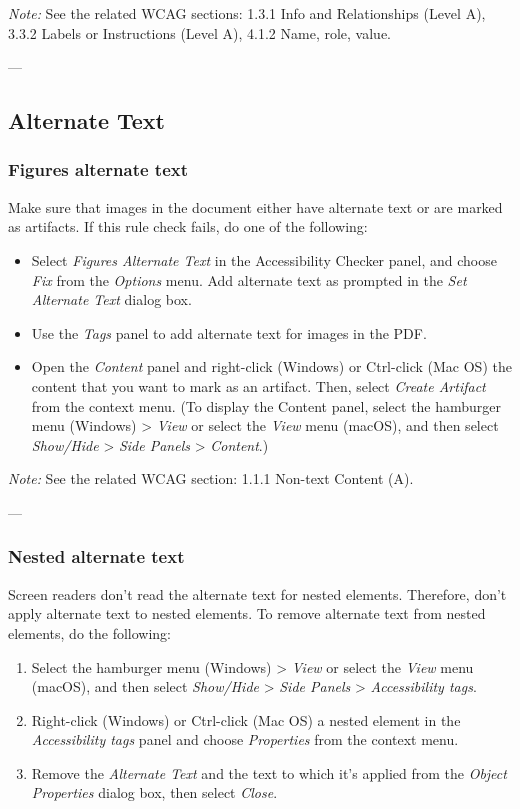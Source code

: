 \vspace{0.5em}
\noindent\textit{Note:} See the related WCAG sections: 1.3.1 Info and Relationships (Level A), 3.3.2 Labels or Instructions (Level A), 4.1.2 Name, role, value\cite{WCAG}.

---

\subsection{Alternate Text}
\subsubsection{Figures alternate text}
Make sure that images in the document either have alternate text or are marked as artifacts\cite{AdobeHelpX}.
If this rule check fails, do one of the following:
\begin{itemize}
    \item Select \emph{Figures Alternate Text} in the Accessibility Checker panel, and choose \emph{Fix} from the \emph{Options} menu. Add alternate text as prompted in the \emph{Set Alternate Text} dialog box.
    \item Use the \emph{Tags} panel to add alternate text for images in the PDF.
    \item Open the \emph{Content} panel and right-click (Windows) or Ctrl-click (Mac OS) the content that you want to mark as an artifact. Then, select \emph{Create Artifact} from the context menu. (To display the Content panel, select the hamburger menu (Windows) > \emph{View} or select the \emph{View} menu (macOS), and then select \emph{Show/Hide} > \emph{Side Panels} > \emph{Content}.)
\end{itemize}

\vspace{0.5em}
\noindent\textit{Note:} See the related WCAG section: 1.1.1 Non-text Content (A)\cite{WCAG}.

---

\subsubsection{Nested alternate text}
Screen readers don't read the alternate text for nested elements. Therefore, don't apply alternate text to nested elements\cite{AdobeHelpX}.
To remove alternate text from nested elements, do the following:
\begin{enumerate}
    \item Select the hamburger menu (Windows) > \emph{View} or select the \emph{View} menu (macOS), and then select \emph{Show/Hide} > \emph{Side Panels} > \emph{Accessibility tags}.
    \item Right-click (Windows) or Ctrl-click (Mac OS) a nested element in the \emph{Accessibility tags} panel and choose \emph{Properties} from the context menu.
    \item Remove the \emph{Alternate Text} and the text to which it's applied from the \emph{Object Properties} dialog box, then select \emph{Close}.
\end{enumerate}

